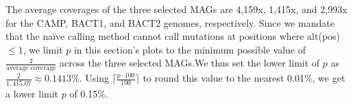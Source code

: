 The average coverages of the three selected MAGs are 4,159x, 1,415x, and 2,993x for the CAMP, BACT1, and BACT2 genomes, respectively. Since we mandate that the na\"ive calling method cannot call mutations at positions where alt(pos) $\leq 1$, we limit $p$ in this section's plots to the minimum possible value of $\frac{2}{\text{average coverage}}$ across the three selected MAGs.We thus set the lower limit of $p$ as $\frac{2}{1,415.07} \approx 0.1413\%$. Using $\bigg\lceil \frac{p \cdot 100}{100} \bigg\rceil$ to round this value to the nearest 0.01\%, we get a lower limit $p$ of 0.15\%.\endinput